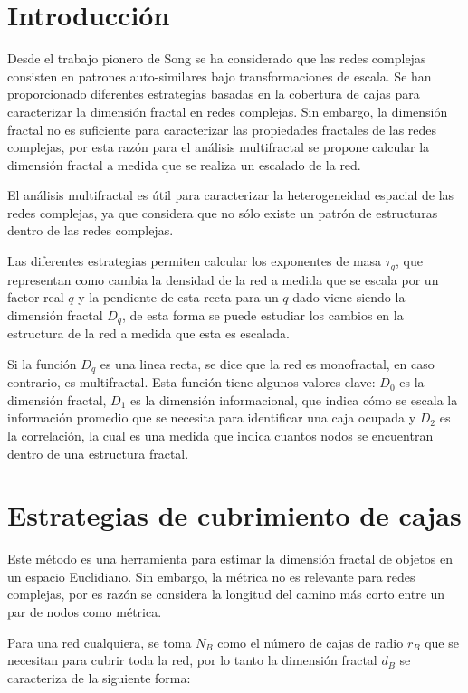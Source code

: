 \section{Introducción}

Desde el trabajo pionero de Song\cite{Song2005} se ha considerado que las redes complejas consisten en patrones auto-similares bajo transformaciones de escala. Se han proporcionado diferentes estrategias basadas en la cobertura de cajas para caracterizar la dimensión fractal en redes complejas. Sin embargo, la dimensión fractal no es suficiente para caracterizar las propiedades fractales de las redes complejas, por esta razón para el análisis multifractal se propone calcular la dimensión fractal a medida que se realiza un escalado de la red.

El análisis multifractal es útil para caracterizar la heterogeneidad espacial de las redes complejas, ya que considera que no sólo existe un patrón de estructuras dentro de las redes complejas.

Las diferentes estrategias permiten calcular los exponentes de masa $\tau_q$, que representan como cambia la densidad de la red a medida que se escala por un factor real $q$ y la pendiente de esta recta para un $q$ dado viene siendo la dimensión fractal $D_q$, de esta forma se puede estudiar los cambios en la estructura de la red a medida que esta es escalada.

Si la función $D_q$ es una linea recta, se dice que la red es monofractal, en caso contrario, es multifractal. Esta función tiene algunos valores clave\cite{Halsey1986}: $D_0$ es la dimensión fractal, $D_1$ es la dimensión informacional, que indica cómo se escala la información promedio que se necesita para identificar una caja ocupada y $D_2$ es la correlación, la cual es una medida que indica cuantos nodos se encuentran dentro de una estructura fractal.

\section{Estrategias de cubrimiento de cajas}
\label{cap4:seccionBox}

Este método es una herramienta para estimar la dimensión fractal de objetos en un espacio Euclidiano. Sin embargo, la métrica no es relevante para redes complejas, por es razón se considera la longitud del camino más corto entre un par de nodos como métrica. 

Para una red cualquiera, se toma $N_B$ como el número de cajas de radio $r_B$ que se necesitan para cubrir toda la red, por lo tanto la dimensión fractal $d_B$ se caracteriza de la siguiente forma:

